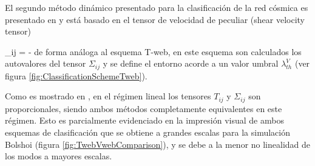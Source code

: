 El segundo método dinámico presentado para la clasificación de la red 
cósmica es presentado en \cite{hoffman2012} y está basado en el tensor de 
velocidad de peculiar (shear velocity tensor)


{ \Sigma_{ij} = - }
de forma análoga al esquema T-web, en este esquema son calculados los 
auto\-valores del tensor $\Sigma_{ij}$ y se define el entorno acorde a un 
valor umbral $\lambda_{th}^V$ (ver figura \ref{fig:ClassificationSchemeTweb}).


Como es mostrado en \cite{hoffman2012}, en el régimen lineal los tensores
$T_{ij}$ y $\Sigma_{ij}$ son proporcionales, siendo ambos métodos 
completamente equivalentes en este régimen. Esto es parcialmente 
evidenciado en la impresión visual de ambos esquemas de clasificación que 
se obtiene a grandes escalas para la simulación Bolshoi (figura 
\ref{fig:TwebVwebComparison}), y se debe a la menor no linealidad de los 
modos a mayores escalas. 


